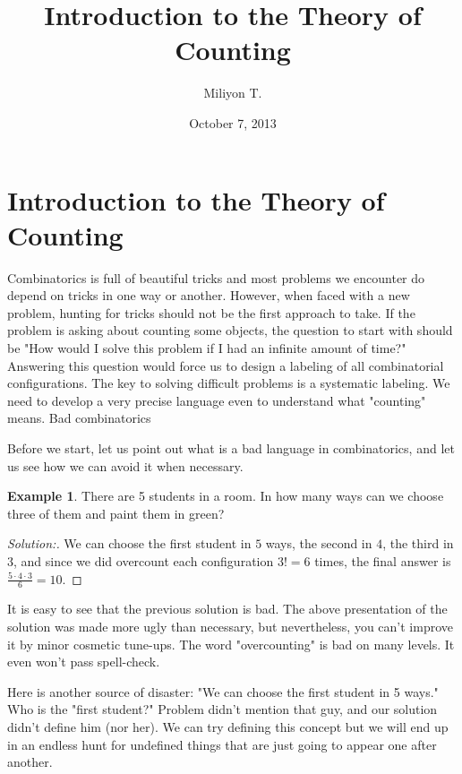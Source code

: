 \documentclass[11pt]{article}
\theoremstyle{definition}
\newtheorem{exmp}[thm]{Example}
\theoremstyle{plain}
\begin{document}
\nocite{}

\title{Introduction to the Theory of Counting}

\author{Miliyon T.}
\date{October 7, 2013}
\maketitle

\section{Introduction to the Theory of Counting}

Combinatorics is full of beautiful tricks and most problems we encounter do depend on tricks in one way or another. However, when faced with a new problem, hunting for tricks should not be the first approach to take. If the problem is asking about counting some objects, the question to start with should be "How would I solve this problem if I had an infinite amount of time?" Answering this question would force us to design a labeling of all combinatorial configurations. The key to solving difficult problems is a systematic labeling. We need to develop a very precise language even to understand what "counting" means.
Bad combinatorics

Before we start, let us point out what is a bad language in combinatorics, and let us see how we can avoid it when necessary.

\begin{exmp}
There are 5 students in a room. In how many ways can we choose three of them and paint them in green?
\end{exmp}

\begin{proof}[Solution:]
We can choose the first student in \( 5 \) ways, the second in \( 4 \), the third in \( 3 \), and since we did overcount each configuration \( 3!=6 \) times, the final answer is \( \frac{5\cdot 4\cdot 3}{6}=10 \).
\end{proof}

It is easy to see that the previous solution is bad. The above presentation of the solution was made more ugly than necessary, but nevertheless, you can't improve it by minor cosmetic tune-ups. The word "overcounting" is bad on many levels. It even won't pass spell-check.

Here is another source of disaster: "We can choose the first student in 5 ways." Who is the "first student?" Problem didn't mention that guy, and our solution didn't define him (nor her). We can try defining this concept but we will end up in an endless hunt for undefined things that are just going to appear one after another.
\end{document}
